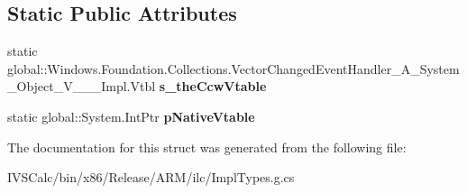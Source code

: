 \subsection*{Static Public Attributes}
\begin{DoxyCompactItemize}
\item 
\mbox{\label{struct_windows_1_1_foundation_1_1_collections_1_1_vector_changed_event_handler___a___system___object___v_______impl_1_1_vtbl_a46b0a19d99887d4e315437c6ace9fe73}} 
static global\+::\+Windows.\+Foundation.\+Collections.\+Vector\+Changed\+Event\+Handler\+\_\+\+A\+\_\+\+System\+\_\+\+Object\+\_\+\+V\+\_\+\+\_\+\+\_\+\+Impl.\+Vtbl {\bfseries s\+\_\+the\+Ccw\+Vtable}
\item 
\mbox{\label{struct_windows_1_1_foundation_1_1_collections_1_1_vector_changed_event_handler___a___system___object___v_______impl_1_1_vtbl_a66b9aab4ca79c49c42b577fb4f6fcbc5}} 
static global\+::\+System.\+Int\+Ptr {\bfseries p\+Native\+Vtable}
\end{DoxyCompactItemize}


The documentation for this struct was generated from the following file\+:\begin{DoxyCompactItemize}
\item 
I\+V\+S\+Calc/bin/x86/\+Release/\+A\+R\+M/ilc/Impl\+Types.\+g.\+cs\end{DoxyCompactItemize}
